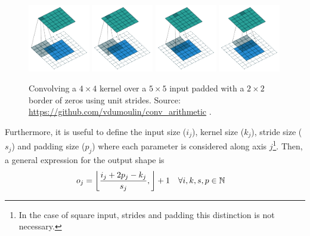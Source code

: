 \begin{itemize}
    \begin{figure}
        \centering
        \includegraphics[width=0.24\textwidth]{Images/Background/Convolution/arbitrary_padding_no_strides_00.pdf}
        \includegraphics[width=0.24\textwidth]{Images/Background/Convolution/arbitrary_padding_no_strides_01.pdf}
        \includegraphics[width=0.24\textwidth]{Images/Background/Convolution/arbitrary_padding_no_strides_02.pdf}
        \includegraphics[width=0.24\textwidth]{Images/Background/Convolution/arbitrary_padding_no_strides_03.pdf}
        \caption[Unit strides and zero padding convolution]{Convolving a $4 \times 4$ kernel over a $5 \times 5$ input padded with a $2 \times 2$ border of zeros using unit strides. Source: \url{https://github.com/vdumoulin/conv_arithmetic} \cite{trans-conv}.}
        \label{fig:arbitrary_padding_no_strides}
    \end{figure}

    Furthermore, it is useful to define the input size ($i_j$), kernel size ($k_j$), stride size ($s_j$) and padding size ($p_j$) where each parameter is considered along axis $j$\footnote{In the case of square input, strides and padding this distinction is not necessary.}. Then, a general expression \cite{trans-conv} for the output shape is
    \begin{align*}
        o_j &= \left\lfloor \frac{i_j+2p_j-k_j}{s_j}, \right\rfloor+1 \quad \forall i,k,s,p \in \mathbb{N}
    \end{align*}


\end{itemize}
